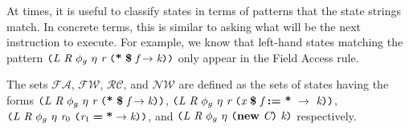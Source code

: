 %

At times, it is useful to classify states in terms of patterns that the state strings match. In concrete terms, this is similar to asking what will be the next instruction to execute. For example, we know that left-hand states matching the pattern $ \lp \cfgnt{L}\ \cfgnt{R}\ \phi_g\ \eta\ \cfgnt{r}\ \lp \cfgt{*}\ \cfgt{\$}\ \cfgnt{f} \rightarrow \cfgnt{k}\rp \rp$ only appear in the Field Access rule.

\begin{definition}
The sets $\mathcal{FA}$, $\mathcal{FW}$, $\mathcal{RC}$, and  $\mathcal{NW}$ are defined as the sets of states having the forms $ \lp \cfgnt{L}\ \cfgnt{R}\ \phi_g\ \eta\ \cfgnt{r}\ \lp \cfgt{*}\ \cfgt{\$}\ \cfgnt{f} \rightarrow \cfgnt{k}\rp \rp$,  $\lp \cfgnt{L}\ \cfgnt{R}\ \phi_g\ \eta\ \cfgnt{r}\ \lp \cfgnt{x}\ \cfgt{\$}\ \cfgnt{f}\ \cfgt{:=}\ \cfgt{*}\ \rightarrow\ \cfgnt{k}\rp \rp$, $\texttt{(} \emph{L}\ \emph{R}\ \phi_g\ \eta\ \emph{r}_0\ \texttt{(} \emph{r}_1\; \textbf{=}\; \textbf{*} \rightarrow \emph{k}\texttt{)} \texttt{)}$, and $\texttt{(} \emph{L}\ \emph{R}\ \phi_g\ \eta\ \texttt{(} \textbf{new}\ \emph{C}\texttt{)} \ \emph{k}\texttt{)}$ respectively.
\end{definition}


